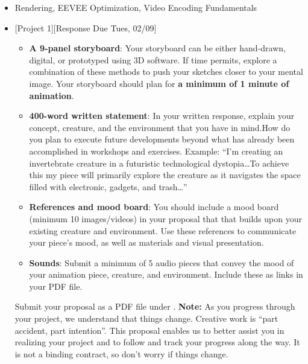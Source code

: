 \def\dMon{Mon, 02/08}
\def\dTues{Tues, 02/09}
\def\dWed{Wed, 02/10}
\def\dThur{Thur, 02/11}
\def\dFri{Fri, 02/12}
\def\dSat{Sat, 02/13}
\def\dSun{Sun, 02/14}
\placeDate

\begin{itemize}[noitemsep,topsep=0pt,leftmargin=*]
    \item {} Rendering, EEVEE Optimization, Video Encoding Fundamentals
    \item {}[Project 1][Response Due \dTues]
          \begin{itemize}
              \item \textbf{A 9-panel storyboard}: Your storyboard can be either hand-drawn, digital, or prototyped using 3D software. If time permits, explore a combination of these methods to push your sketches closer to your mental image. Your storyboard should plan for \textbf{a minimum of 1 minute of animation}.
              \item \textbf{400-word written statement}: In your written response, explain your concept, creature, and the environment that you have in mind.How do you plan to execute future developments beyond what has already been accomplished in workshops and exercises. \newline
                    Example: ``I'm creating an invertebrate creature in a futuristic technological dystopia\dots To achieve this my piece will primarily explore the creature as it navigates the space filled with electronic, gadgets, and trash\dots''
              \item \textbf{References and mood board}: You should include a mood board (minimum 10 images/videos) in your proposal that that builds upon your existing creature and environment. Use these references to communicate your piece's mood, as well as materials and visual presentation.
              \item \textbf{Sounds}: Submit a minimum of 5 audio pieces that convey the mood of your animation piece, creature, and environment. Include these as links in your PDF file.
          \end{itemize}
          Submit your proposal as a PDF file under . \newline
          \small{\textbf{Note:} As you progress through your project, we understand that things change. Creative work is ``part accident, part intention''. This proposal enables us to better assist you in realizing your project and to follow and track your progress along the way. It is not a binding contract, so don't worry if things change.}

\end{itemize}
